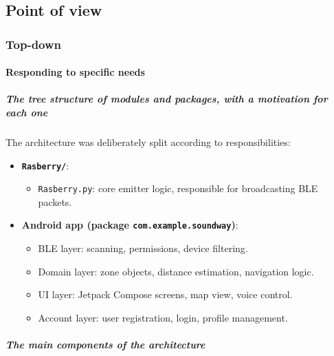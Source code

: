 \documentclass[12pt,a4paper]{article}
\begin{document}
\pagebreak

\subsection{Point of view}

\subsubsection{Top-down}

\paragraph{Responding to specific needs}

\subparagraph{The tree structure of modules and packages, with a motivation for each one}

The architecture was deliberately split according to responsibilities:

\begin{itemize}
    \item \textbf{\texttt{Rasberry/}}:
    \begin{itemize}
        \item \texttt{Rasberry.py}: core emitter logic, responsible for broadcasting BLE packets.
    \end{itemize}

    \item \textbf{Android app (package \texttt{com.example.soundway})}:
    \begin{itemize}
        \item BLE layer: scanning, permissions, device filtering.
        \item Domain layer: zone objects, distance estimation, navigation logic.
        \item UI layer: Jetpack Compose screens, map view, voice control.
        \item Account layer: user registration, login, profile management.
    \end{itemize}
\end{itemize}

\subparagraph{The main components of the architecture}
\end{document}
